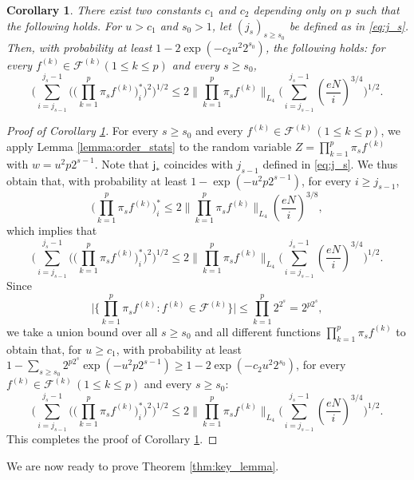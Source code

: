 \documentclass[numbers,webpdf,imaiai]{ima-authoring-template}
\theoremstyle{thmstyletwo}%
\newtheorem{corollary}[theorem]{Corollary}
\numberwithin{equation}{section}
\numberwithin{equation}{section}
\newcommand{\F}{\mathcal{F}}
\begin{document}
\begin{corollary}\label{coro:order_stats}
There exist two constants $c_1$ and $c_2$ depending only on $p$ such that the following holds. For $u>c_1$ and $s_0>1$, let $(j_s)_{s\ge s_0}$ be defined as in \eqref{eq:j_s}. Then, with probability at least $1-2\exp(-c_2 u^2 2^{s_0})$, the following holds: for every $f^{(k)}\in \F^{(k)} (1\le k\le p)$ and every $s\ge s_0$,
\[
\Bigg(\sum_{i=j_{s-1}}^{j_{s}-1}\bigg(\bigg(\prod_{k=1}^{p}\pi_{s} f^{(k)}\bigg)_i^{*}\bigg)^{2}\Bigg)^{1 / 2}\le 2 \bigg\|\prod_{k=1}^{p}\pi_s f^{(k)}\bigg\|_{L_4}  \Bigg(\sum_{i=j_{s-1}}^{j_{s}-1}\left(\frac{e N}{i}\right)^{3/4}\Bigg)^{1 / 2}.
\]
\end{corollary}

\begin{proof}[Proof of Corollary \ref{coro:order_stats}]
For every $s\ge s_0$ and every $f^{(k)}\in \F^{(k)} \,(1\le k\le p)$, we apply Lemma \ref{lemma:order_stats} to the random variable $Z=\prod_{k=1}^{p} \pi_s f^{(k)}$ with $w=u^2 p 2^{s-1}$. Note that $\mathsf{j_{*}}$ coincides with $j_{s-1}$ defined in \eqref{eq:j_s}. We thus obtain that, with probability at least $1-\exp(-u^2 p 2^{s-1})$, for every $i\ge j_{s-1}$,
\[
\bigg(\prod_{k=1}^{p}\pi_s f^{(k)}\bigg)_i^* \le 2 \bigg\|\prod_{k=1}^{p}\pi_s f^{(k)}\bigg\|_{L_4} \left(\frac{eN}{i}\right)^{3/8},
\]
which implies that
\[
\Bigg(\sum_{i=j_{s-1}}^{j_{s}-1}\bigg(\bigg(\prod_{k=1}^{p}\pi_{s} f^{(k)}\bigg)_i^{*}\bigg)^{2}\Bigg)^{1 / 2}\le 2 \bigg\|\prod_{k=1}^{p}\pi_s f^{(k)}\bigg\|_{L_4}  \bigg(\sum_{i=j_{s-1}}^{j_{s}-1}\left(\frac{e N}{i}\right)^{3/4}\bigg)^{1 / 2}.
\]
Since
\[
\bigg|\bigg\{\prod_{k=1}^{p}\pi_{s}f^{(k)}: f^{(k)}\in \F^{(k)} \bigg\} \bigg|\le \prod_{k=1}^{p}2^{2^{s}}= 2^{p2^{s}},
\]
we take a union bound over all $s\ge s_0$ and all different functions $\prod_{k=1}^{p}\pi_{s}f^{(k)}$ to obtain that, for $u\ge c_1$, with probability at least $1-\sum_{s\ge s_0}2^{p2^s}\exp(-u^2 p 2^{s-1}) \ge 1-2\exp(-c_2 u^2 2^{s_0})$, for every $f^{(k)}\in \F^{(k)} \, (1\le k\le p)$ and every $s\ge s_0$:
\[
\Bigg(\sum_{i=j_{s-1}}^{j_{s}-1}\bigg(\bigg(\prod_{k=1}^{p}\pi_{s} f^{(k)}\bigg)_i^{*}\bigg)^{2}\Bigg)^{1 / 2}\le 2 \bigg\|\prod_{k=1}^{p}\pi_s f^{(k)}\bigg\|_{L_4}  \bigg(\sum_{i=j_{s-1}}^{j_{s}-1}\left(\frac{e N}{i}\right)^{3/4}\bigg)^{1 / 2}.
\]
This completes the proof of Corollary \ref{coro:order_stats}.
\end{proof}

We are now ready to prove Theorem \ref{thm:key_lemma}.
\end{document}
